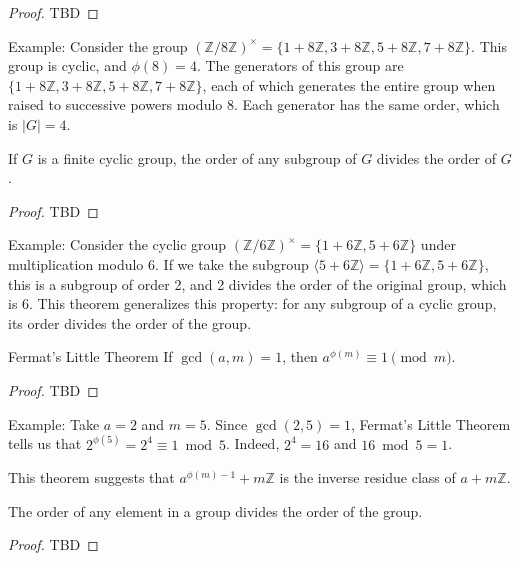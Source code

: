 \documentclass{article}
\begin{document}
\begin{proof}
    TBD
\end{proof}

Example: Consider the group $(\mathbb{Z}/8\mathbb{Z})^{\times} = \{1+8\mathbb{Z}, 3+8\mathbb{Z}, 5+8\mathbb{Z}, 7+8\mathbb{Z}\}$. This group is cyclic, and $\phi(8) = 4$. The generators of this group are $\{1+8\mathbb{Z}, 3+8\mathbb{Z}, 5+8\mathbb{Z}, 7+8\mathbb{Z}\}$, each of which generates the entire group when raised to successive powers modulo 8. Each generator has the same order, which is $|G| = 4$.

\begin{theorem}{}{} If $G$ is a finite cyclic group, the order of any subgroup of $G$ divides the order of $G$. \end{theorem}

\begin{proof}
    TBD
\end{proof}

Example: Consider the cyclic group $(\mathbb{Z}/6\mathbb{Z})^{\times} = \{1+6\mathbb{Z}, 5+6\mathbb{Z}\}$ under multiplication modulo 6. If we take the subgroup $\langle 5+6\mathbb{Z} \rangle = \{1+6\mathbb{Z}, 5+6\mathbb{Z}\}$, this is a subgroup of order 2, and 2 divides the order of the original group, which is 6. This theorem generalizes this property: for any subgroup of a cyclic group, its order divides the order of the group.

\begin{theorem}{Fermat's Little Theorem}{} If $\gcd(a, m) = 1$, then $a^{\phi(m)} \equiv 1 \pmod{m}$. \end{theorem}

\begin{proof}
    TBD
\end{proof}

Example: Take $a = 2$ and $m = 5$. Since $\gcd(2, 5) = 1$, Fermat's Little Theorem tells us that $2^{\phi(5)} = 2^4 \equiv 1 \bmod 5$. Indeed, $2^4 = 16$ and $16 \bmod 5 = 1$.

This theorem suggests that $a^{\phi(m) - 1} + m \mathbb{Z}$ is the inverse residue class of $a + m \mathbb{Z}$.

\begin{theorem}{}{} The order of any element in a group divides the order of the group. \end{theorem}

\begin{proof}
    TBD
\end{proof}
\end{document}
